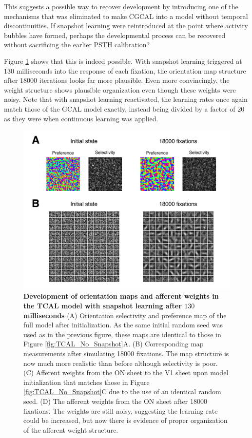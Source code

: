 \documentclass[phd,ianc,twoside]{infthesis}
\begin{document}
This suggests a possible way to recover development by introducing one of the
mechanisms that was eliminated to make CGCAL into a model without
temporal discontinuities. If snapshot learning were reintroduced at the
point where activity bubbles have formed, perhaps the developmental
process can be recovered without sacrificing the earlier PSTH
calibration?

Figure \ref{fig:TCAL_Snapshot} shows that this is indeed possible. With
snapshot learning triggered at $130$ milliseconds into the response of
each fixation, the orientation map structure after $18000$ iterations
looks far more plausible. Even more convincingly, the weight structure
shows plausible organization even though these weights were noisy. Note
that with snapshot learning reactivated, the learning rates once again
match those of the GCAL model exactly, instead being divided by a factor
of $20$ as they were when continuous learning was applied.


\begin{figure}
\center
\includegraphics[width=1\textwidth]{./figures/TCAL_OR_Snapshot.pdf}
\caption{{\bf Development of orientation maps and afferent weights in
    the TCAL model with snapshot learning after $130$ milliseconds} (A)
  Orientation selectivity and preference map of the full model after
  initialization. As the same initial random seed was used as in the
  previous figure, these maps are identical to those in Figure
  \ref{fig:TCAL_No_Snapshot}A. (B) Corresponding map measurements after
  simulating 18000 fixations. The map structure is now much more
  realistic than before although selectivity is poor. (C) Afferent weights
  from the ON sheet to the V1 sheet upon model initialization that
  matches those in Figure \ref{fig:TCAL_No_Snapshot}C due to the use of
  an identical random seed. (D) The afferent weights from the ON sheet
  after 18000 fixations. The weights are still noisy, suggesting the
  learning rate could be increased, but now there is evidence of proper
  organization of the afferent weight structure.}
\label{fig:TCAL_Snapshot}
\end{figure}
\end{document}

